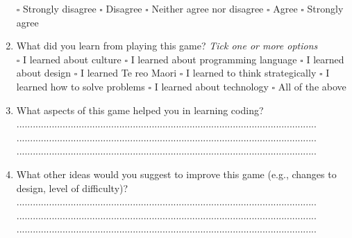 \documentclass[12pt]{article}\pagestyle{myheadings}
\theoremstyle{plain}
\begin{document}
\begin{enumerate}
$\square$ Strongly disagree $\square$ Disagree $\square$ Neither agree nor disagree $\square$ Agree $\square$ Strongly agree


\item What did you learn from playing this game? \textit{Tick one or more options}\\
$\square$  I learned about culture $\square$  I learned about programming language $\square$ I learned about design $\square$ I learned Te reo Maori $\square$ I learned to think strategically $\square$ I learned how to solve problems $\square$ I learned about technology
$\square$ All of the above
\item What aspects of this game helped you in learning coding?\\
...............................................................................................................\\
...............................................................................................................\\
...............................................................................................................\\


\item What other ideas would you suggest to improve this game (e.g., changes to design, level of difficulty)?\\
...............................................................................................................\\
...............................................................................................................\\
...............................................................................................................\\


\end{enumerate}
\end{document}
